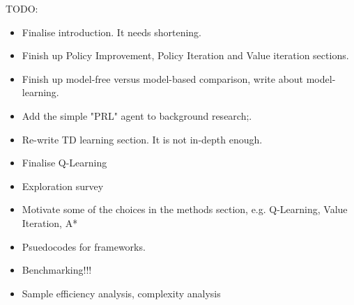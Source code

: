 TODO:
\begin{itemize}
    \item Finalise introduction. It needs shortening.
    \item Finish up Policy Improvement, Policy Iteration and Value iteration sections.
    \item Finish up model-free versus model-based comparison, write about model-learning.
    \item Add the simple "PRL" agent to background research;.
    \item Re-write TD learning section. It is not in-depth enough.
    \item Finalise Q-Learning
    \item Exploration survey
    \item Motivate some of the choices in the methods section, e.g. Q-Learning, Value Iteration, A*
    \item Psuedocodes for frameworks.
    \item Benchmarking!!!
    \item Sample efficiency analysis, complexity analysis
\end{itemize}